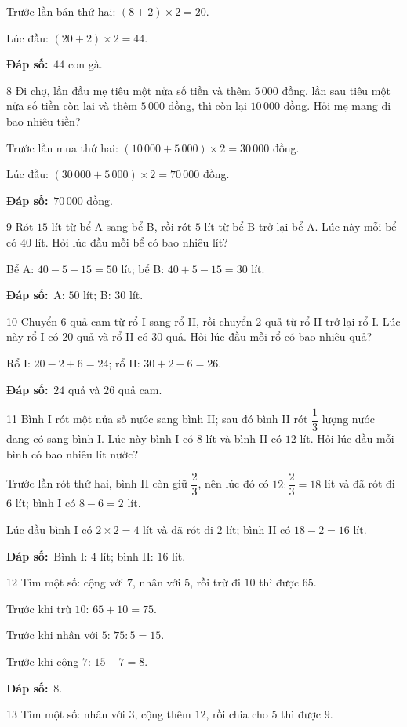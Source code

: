 \documentclass[11pt]{article}
\newif\ifsol \solfalse
\providecommand{\AnsWord}{Đáp số}
\newcommand{\dapso}[1]{\par\textbf{\AnsWord:}\ #1}
\newcommand{\probsol}[1]{%
  \begin{lrbox}{\solmeasure}\begin{minipage}{\dimexpr\linewidth-24pt\relax}#1\end{minipage}\end{lrbox}%
  \ifsol
    \begin{solbox}#1\end{solbox}%
  \else
    \setlength{\solht}{\dimexpr\ht\solmeasure+\dp\solmeasure+0.85cm\relax}%
    \ifdim\solht<1.35cm\setlength{\solht}{1.35cm}\fi
    \begin{tcolorbox}[colback=white,colframe=Line,boxrule=0.8pt,arc=5pt,
      left=8pt,right=8pt,top=4pt,bottom=4pt,height=\solht]{\footnotesize\color{Slate}\itshape\WorkWord}\end{tcolorbox}%
  \fi}
\newcommand{\gap}{\vspace{0.3cm}}
\def\WorkWord{Bài làm:}
\def\AnsWord{Đáp số}
\begin{document}
\probsol{
Trước lần bán thứ hai: $(8+2)\times2=20$.\par Lúc đầu: $(20+2)\times2=44$.
\dapso{$44$ con gà.}}
\gap
\begin{probbox}{8}{\relax}
Đi chợ, lần đầu mẹ tiêu một nửa số tiền và thêm $5\,000$ đồng, lần sau tiêu một nửa số tiền còn lại và thêm $5\,000$ đồng, thì còn lại $10\,000$ đồng. Hỏi mẹ mang đi bao nhiêu tiền?
\end{probbox}
\probsol{
Trước lần mua thứ hai: $(10\,000+5\,000)\times2=30\,000$ đồng.\par Lúc đầu: $(30\,000+5\,000)\times2=70\,000$ đồng.
\dapso{$70\,000$ đồng.}}
\gap
\begin{probbox}{9}{\relax}
Rót $15$ lít từ bể A sang bể B, rồi rót $5$ lít từ bể B trở lại bể A. Lúc này mỗi bể có $40$ lít. Hỏi lúc đầu mỗi bể có bao nhiêu lít?
\end{probbox}
\probsol{
Bể A: $40-5+15=50$ lít; bể B: $40+5-15=30$ lít.
\dapso{A: $50$ lít; B: $30$ lít.}}
\gap
\begin{probbox}{10}{\relax}
Chuyển $6$ quả cam từ rổ I sang rổ II, rồi chuyển $2$ quả từ rổ II trở lại rổ I. Lúc này rổ I có $20$ quả và rổ II có $30$ quả. Hỏi lúc đầu mỗi rổ có bao nhiêu quả?
\end{probbox}
\probsol{
Rổ I: $20-2+6=24$; rổ II: $30+2-6=26$.
\dapso{$24$ quả và $26$ quả cam.}}
\gap
\begin{probbox}{11}{\relax}
Bình I rót một nửa số nước sang bình II; sau đó bình II rót $\dfrac13$ lượng nước đang có sang bình I. Lúc này bình I có $8$ lít và bình II có $12$ lít. Hỏi lúc đầu mỗi bình có bao nhiêu lít nước?
\end{probbox}
\probsol{
Trước lần rót thứ hai, bình II còn giữ $\dfrac23$, nên lúc đó có $12:\dfrac23=18$ lít và đã rót đi $6$ lít; bình I có $8-6=2$ lít.\par
Lúc đầu bình I có $2\times2=4$ lít và đã rót đi $2$ lít; bình II có $18-2=16$ lít.
\dapso{Bình I: $4$ lít; bình II: $16$ lít.}}
\gap
\begin{probbox}{12}{\relax}
Tìm một số: cộng với $7$, nhân với $5$, rồi trừ đi $10$ thì được $65$.
\end{probbox}
\probsol{
Trước khi trừ $10$: $65+10=75$.\par Trước khi nhân với $5$: $75:5=15$.\par Trước khi cộng $7$: $15-7=8$.
\dapso{$8$.}}
\gap
\begin{probbox}{13}{\relax}
Tìm một số: nhân với $3$, cộng thêm $12$, rồi chia cho $5$ thì được $9$.
\end{probbox}
\end{document}
